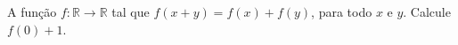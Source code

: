 \item  A função $f:\mathbb{R}\rightarrow \mathbb{R}$  tal que
  $f(x+y)=f(x)+f(y)$, para todo $x$ e $y$. Calcule $f(0)+1$.

